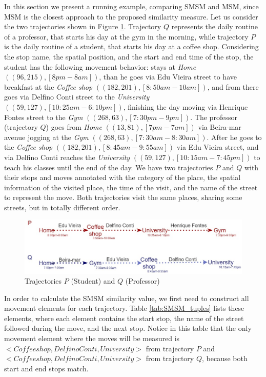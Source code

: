 \documentclass[12pt]{article}
\begin{document}
In this section we present a running example, comparing SMSM and MSM, since MSM is the closest approach to the proposed similarity measure.
Let us consider the two trajectories shown in Figure \ref{fig:bus}. Trajectory $Q$ represents the daily routine of a professor, that starts his day at the gym in the morning, while trajectory $P$ is the daily routine of a student, that starts his day at a coffee shop. Considering the stop name, the spatial position, and the start and end time of the stop, the student has the following movement behavior: stays at \textit{Home} $((96,215), [8pm-8am])$, than he goes via Edu Vieira street to have breakfast at the \textit{Coffee shop} $((182,201), [8:50am-10am])$, and from there goes via Delfino Conti street to the \textit{University} $((59,127), [10:25am-6:10pm])$, finishing the day moving via Henrique Fontes street to the \textit{Gym} $((268,63), [7:30pm-9pm])$. The professor (trajectory $Q$) goes from \textit{Home} $((13,81), [7pm-7am])$ via Beira-mar avenue jogging at the \textit{Gym} $((268,63), [7:30am-8:30am])$. After he goes to the \textit{Coffee shop} $((182,201), [8:45am-9:55am])$ via Edu Vieira street, and via Delfino Conti reaches the \textit{University} $((59,127), [10:15am-7:45pm])$ to teach his classes until the end of the day. We have two trajectories $P$ and $Q$ with their stops and moves annotated with the category of the place, the spatial information of the visited place, the time of the visit, and the name of the street to represent the move. Both trajectories visit the same places, sharing some streets, but in totally different order.
\begin{figure}[h!]
\centering
\includegraphics[width=1\textwidth]{Images/running_example.jpg}
\caption{\label{fig:bus} Trajectories $P$ (Student) and $Q$ (Professor)}
\end{figure}


In order to calculate the SMSM similarity value, we first need to construct all movement elements for each trajectory. Table \ref{tab:SMSM_tuples} lists these elements, where each element contains the start stop, the name of the street followed during the move, and the next stop. Notice in this table that the only movement element where the moves will be measured is $<Coffee shop, Delfino Conti, University>$ from trajectory $P$ and $<Coffee shop, Delfino Conti, University>$ from trajectory $Q$, because both start and end stops match.
\end{document}
